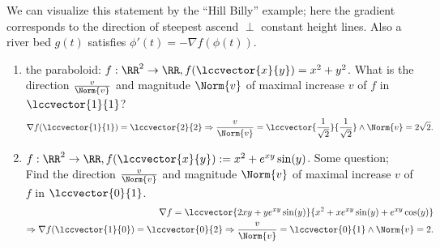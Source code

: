 \begin{rem}
  We can visualize this statement by the ``Hill Billy'' example; here the gradient corresponds to the direction of steepest ascend $\perp$ constant height lines. Also a river bed $g(t)$ satisfies $\phi'(t)=-\nabla f(\phi(t))$.
\end{rem}
\begin{exam}
  \begin{enumerate}
  	\item the paraboloid: $f:\RR^2\to\RR, f(\lccvector{x}{y})=x^2+y^2$. What is the direction $\frac{v}{\Norm{v}}$ and magnitude $\Norm{v}$ of maximal increase $v$ of $f$ in $\lccvector{1}{1}$?
  	$$\nabla f(\lccvector{1}{1})=\lccvector{2}{2}\Rightarrow \frac{v}{\Norm{v}}=\lccvector{\frac{1}{\sqrt{2}}}{\frac{1}{\sqrt{2}}}\land \Norm{v}=2\sqrt{2}.$$
  	\item $f:\RR^2\to \RR, f(\lccvector{x}{y}):=x^2+e^{xy}\sin(y)$.
  	Some question; Find the direction $\frac{v}{\Norm{v}}$ and magnitude $\Norm{v}$ of maximal increase $v$ of $f$ in $\lccvector{0}{1}$.
  	\begin{align*}\nabla f=\lccvector{2xy+ye^{xy}\sin(y)}{x^2+xe^{xy}\sin(y)+e^{xy}\cos(y)}\\\Rightarrow \nabla f(\lccvector{1}{0})=\lccvector{0}{2}\Rightarrow \frac{v}{\Norm{v}}=\lccvector{0}{1}\land \Norm{v}=2.\end{align*}
  \end{enumerate}
\end{exam}